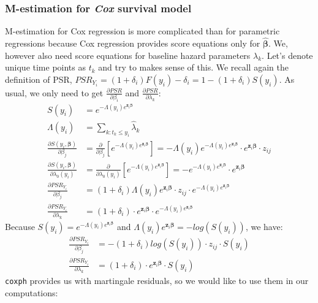 \documentclass[]{article}
\begin{document}
\subsubsection{M-estimation for \emph{Cox} survival model}
M-estimation for Cox regression is more complicated than for parametric regressions because Cox regression provides score equations only for $\hat{\pmb{\beta}}$. We, however also need score equations for baseline hazard parameters $\lambda_k$. Let's denote unique time points as $t_k$ and try to makes sense of this. We recall again the definition of PSR, $PSR_{Y_i} =  (1+\delta_i) F(y_i)  -  \delta_i = 1- (1+\delta_i) S(y_i)$. 
As usual, we only need to get $\frac{\partial PSR}{\partial \beta_i}$ and $\frac{\partial PSR}{\partial \lambda_k}$:
$$
  \begin{aligned}
    S(y_i) &=  e^{-\Lambda(y_i) e^{\pmb{z}_i\pmb{\beta}}} \\
    \Lambda(y_i)  &= \sum_{k: t_k\leq y_i} \hat{\lambda}_k\\
    \frac{\partial S(y_i, \pmb{\beta})}{\partial \beta_j} &= \frac{\partial}{\partial \beta_j}\left[  e^{-\Lambda(y_i) e^{\pmb{z}_i\pmb{\beta}}}  \right] =   -\Lambda(y_i)e^{-\Lambda(y_i) e^{\pmb{z}_i\pmb{\beta}}}  \cdot  e^{\pmb{z}_i\pmb{\beta}}   \cdot z_{ij} \\
    \frac{\partial S(y_i, \pmb{\beta})}{\partial \lambda_0(y_i)} &= \frac{\partial}{\partial \lambda_0(y_i)}\left[  e^{-\Lambda(y_i) e^{\pmb{z}_i\pmb{\beta}}}  \right] =   -e^{-\Lambda(y_i) e^{\pmb{z}_i\pmb{\beta}}}  \cdot  e^{\pmb{z}_i\pmb{\beta}}\\
    \frac{\partial PSR_{Y_i}}{\partial \beta_j} &=  (1+\delta_i)\Lambda(y_i) e^{\pmb{z}_i\pmb{\beta}}   \cdot  z_{ij}  \cdot  e^{-\Lambda(y_i) e^{\pmb{z}_i\pmb{\beta}}}\\
    \frac{\partial PSR_{Y_i}}{\partial \lambda_k} &=  (1+\delta_i)\cdot  e^{\pmb{z}_i\pmb{\beta}}   \cdot  e^{-\Lambda(y_i) e^{\pmb{z}_i\pmb{\beta}}}
  \end{aligned}
  $$
Because $S(y_i) =  e^{-\Lambda(y_i) e^{\pmb{z}_i\pmb{\beta}}}$ and $\Lambda(y_i) e^{\pmb{z}_i\pmb{\beta}} = -log\left(S(y_i)\right)$, we have:
$$
  \begin{aligned}
    \frac{\partial PSR_{Y_i}}{\partial \beta_j} &=  -(1+\delta_i)log\left(S(y_i)\right) \cdot  z_{ij}  \cdot  S(y_i)\\
    \frac{\partial PSR_{Y_i}}{\partial \lambda_k} &=  (1+\delta_i)\cdot  e^{\pmb{z}_i\pmb{\beta}}   \cdot  S(y_i)
  \end{aligned}
  $$
\texttt{coxph} provides us with martingale residuals, so we would like to use them in our computations: 
\end{document}
